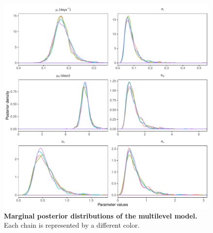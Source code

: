 \documentclass[12pt]{article}
\begin{document}
\pagebreak

\begin{figure}[!h]
\includegraphics[width=\textwidth]{posterior_dist.pdf}
\caption{
\textbf{Marginal posterior distributions of the multilevel model.}
Each chain is represented by a different color.
}
\end{figure}
\end{document}
